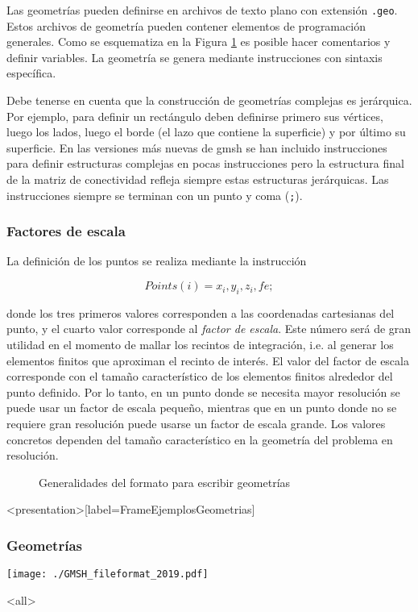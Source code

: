 
Las geometrías pueden definirse en archivos de texto plano con
extensión \texttt{.geo}. Estos archivos de geometría pueden
contener elementos de programación generales. Como se
esquematiza en la Figura \ref{FiguraEjemploGeometrias} 
es posible hacer comentarios y definir variables. La geometría
se genera mediante instrucciones con sintaxis específica. 

Debe tenerse en cuenta que la construcción de geometrías 
complejas es jerárquica. Por ejemplo, para definir un 
rectángulo deben definirse primero sus vértices, luego 
los lados, luego el borde (el lazo que contiene la superficie) y
por último su superficie. En las versiones más nuevas de gmsh
se han incluido instrucciones para definir estructuras complejas
en pocas instrucciones pero la estructura final de la 
matriz de conectividad refleja siempre estas estructuras jerárquicas. 
Las instrucciones siempre se terminan con un punto y coma (\texttt{;}).

\subsubsection{Factores de escala}
La definición de los puntos se realiza mediante la instrucción 

$$ Points( i ) = { x_i, y_i , z_i , fe } ; $$

donde los tres primeros valores corresponden a las coordenadas
cartesianas del punto, y el cuarto valor corresponde al 
\emph{factor de escala}. Este número será de gran utilidad
en el momento de mallar los recintos de integración, i.e. al 
generar los elementos finitos que aproximan el recinto de interés. 
El valor del factor de escala corresponde con el tamaño 
característico de los elementos finitos alrededor del punto
definido. Por lo tanto, en un punto donde se necesita 
mayor resolución se puede usar un factor de escala pequeño,
mientras que en un punto donde no se requiere gran resolución
puede usarse un factor de escala grande. Los valores 
concretos dependen del tamaño característico en la geometría 
del problema en resolución. 

\begin{figure}
  \caption{Generalidades del formato para escribir geometrías
  \label{FiguraEjemploGeometrias}
  }

\end{figure}

\mode*
\begin{frame}<presentation>[label=FrameEjemplosGeometrias]
  \frametitle{Geometrías}

  \texttt{[image: ./GMSH\_fileformat\_2019.pdf]}

\end{frame}

\mode<all>
